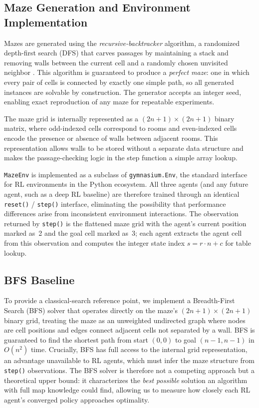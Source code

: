 \documentclass[11pt]{article}
\begin{document}
\subsection{Maze Generation and Environment Implementation}

Mazes are generated using the \emph{recursive-backtracker} algorithm, a
randomized depth-first search (DFS) that carves passages by maintaining a
stack and removing walls between the current cell and a randomly chosen
unvisited neighbor \cite{buck2015}. This algorithm is guaranteed to produce
a \emph{perfect maze}: one in which every pair of cells is connected by
exactly one simple path, so all generated instances are solvable by
construction. The generator accepts an integer seed, enabling exact
reproduction of any maze for repeatable experiments.

The maze grid is internally represented as a $(2n+1) \times (2n+1)$
binary matrix, where odd-indexed cells correspond to rooms and
even-indexed cells encode the presence or absence of walls between
adjacent rooms. This representation allows walls to be stored without a
separate data structure and makes the passage-checking logic in the step
function a simple array lookup.

\texttt{MazeEnv} is implemented as a subclass of \texttt{gymnasium.Env},
the standard interface for RL environments in the Python ecosystem. All
three agents (and any future agent, such as a deep RL baseline) are
therefore trained through an identical \texttt{reset()} / \texttt{step()}
interface, eliminating the possibility that performance differences arise
from inconsistent environment interactions. The observation returned by
\texttt{step()} is the flattened maze grid with the agent's current
position marked as~2 and the goal cell marked as~3; each agent extracts
the agent cell from this observation and computes the integer state index
$s = r \cdot n + c$ for table lookup.


\subsection{BFS Baseline}

To provide a classical-search reference point, we implement a
Breadth-First Search (BFS) solver that operates directly on the maze's
$(2n+1)\times(2n+1)$ binary grid, treating the maze as an unweighted
undirected graph where nodes are cell positions and edges connect adjacent
cells not separated by a wall. BFS is guaranteed to find the shortest path
from start $(0,0)$ to goal $(n-1, n-1)$ in $O(n^2)$ time. Crucially,
BFS has full access to the internal grid representation, an advantage
unavailable to RL agents, which must infer the maze structure from
\texttt{step()} observations. The BFS solver is therefore not a competing
approach but a theoretical upper bound: it characterizes the
\emph{best possible} solution an algorithm with full map knowledge could
find, allowing us to measure how closely each RL agent's converged
policy approaches optimality.
\end{document}
